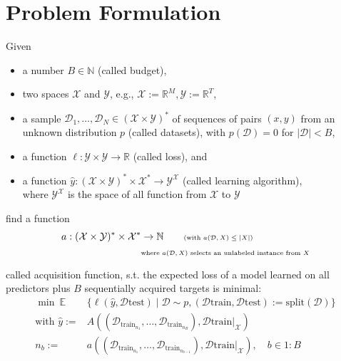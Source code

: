 \documentclass[]{article}
\newcommand{\R}{\mathbb{R}}
\newcommand{\EE}{\mathbb{E}}
\newcommand{\N}{\mathbb{N}}
\newcommand{\D}{\mathcal{D}}
\newcommand{\X}{\mathcal{X}}
\newcommand{\Y}{\mathcal{Y}}
\newcommand{\test}{\text{test}}
\newcommand{\train}{\text{train}}
\begin{document}

 

\appendix

\section{Problem Formulation}\label{app:problem_formulation}
Given
\begin{itemize}
	\item a number $B\in\N$ (called budget),
	\item two spaces $\X$ and $\Y$,  {\tiny e.g., $\X:=\R^M, \Y:=\R^T$},
	\item a sample $\D_1,\ldots,\D_N \in (\X\times \Y)^*$ of
	sequences of pairs $(x,y)$  from an unknown distribution $p$
	(called datasets),
	{\tiny with $p(\D)=0$ for $|\D|<B$,}
	\item a function $\ell:\Y\times\Y\rightarrow\R$ (called loss), and
	\item a function $\hat y:  (\X\times \Y)^* \times \X^* \rightarrow \Y^\X$
	(called learning algorithm), \\
	{\tiny where $\Y^\X$ is the space of all function from $\X$ to $\Y$}
\end{itemize}
find a function
\vspace*{-0.5cm}
\begin{align*}
	a: (\X\times \Y)^* \times \X^* &\rightarrow \N
	\quad\quad \text{\tiny (with $a(\D,X) \leq |X|$)} \\
	& \text{\tiny where $a(\D,X)$ selects an unlabeled instance from $X$}
\end{align*}

called acquisition function,
s.t. the expected loss of a model learned on all predictors plus $B$ sequentially acquired targets
is minimal:
\begin{align*}
	\min\ \EE\   &  \{
	\ell(\hat y, \D\test)
	\mid \D\sim p, (\D\train,\D\test):= \text{split}(\D) \}
	\\
	\text{with }
	\hat y:= & A( (\D_{\train_{n_1}},\ldots,\D_{\train_{n_B}}), \D\train|_{\X})
	\\ 
	n_b := & a( (\D_{\train_{n_1}},\ldots,\D_{\train_{n_{b-1}}}), \D\train|_{\X}) ,
	\quad b\in 1{:}B
\end{align*}
\end{document}
